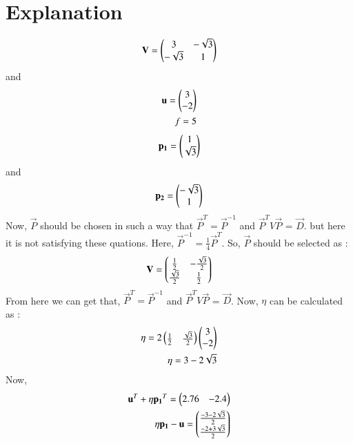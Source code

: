 \documentclass[journal,12pt,twocolumn]{IEEEtran}
\begin{document}
\section{Explanation}

\begin{align}
\mathbf{V} = \begin{pmatrix}3 & -\sqrt{3}\\-\sqrt{3} & 1\end{pmatrix}
\end{align}
and 
\begin{align}
\mathbf{u} = \begin{pmatrix}3 \\ -2\end{pmatrix}\\
f=5
\end{align}
\begin{align}
\mathbf{p_1} = \begin{pmatrix}1 \\ \sqrt{3}\end{pmatrix}
\end{align}
and 
\begin{align}
\mathbf{p_2} = \begin{pmatrix}-\sqrt{3} \\ 1\end{pmatrix}
\end{align}
Now,
$\vec{P}$ should be chosen in such a way that $\vec{P}^T = \vec{P}^{-1}$ and 
$\vec{P}^T V \vec{P}$ = $\vec{D}$. but here it is not satisfying these quations. Here, $\vec{P}^{-1} =\frac{1}{4} \vec{P}^T$. So, $\vec{P}$ should be selected as :
\begin{align}
\mathbf{V} = \begin{pmatrix}\frac{1}{2} & -\frac{\sqrt{3}}{2}\\\frac{\sqrt{3}}{2} & \frac{1}{2}\end{pmatrix}
\end{align}
From here we can get that, $\vec{P}^T = \vec{P}^{-1}$ and $\vec{P}^T V \vec{P}$ = $\vec{D}$.
Now, $\eta$ can be calculated as : 
\begin{align}
\eta = 2 \begin{pmatrix}\frac{1}{2} & \frac{\sqrt{3}}{2}\end{pmatrix} \begin{pmatrix}3 \\ -2\end{pmatrix}\\
\eta =  3-2\sqrt{3}
\end{align}
Now, 
\begin{align}
\mathbf{u}^T + \eta \mathbf{p_1}^T = \begin{pmatrix}2.76 & -2.4\end{pmatrix}\\
\eta \mathbf{p_1} -\mathbf{u}= \begin{pmatrix}\frac{-3 - 2\sqrt{3}}{2}\\ \frac{-2 + 3\sqrt{3}}{2} \end{pmatrix}
\end{align}
\end{document}
